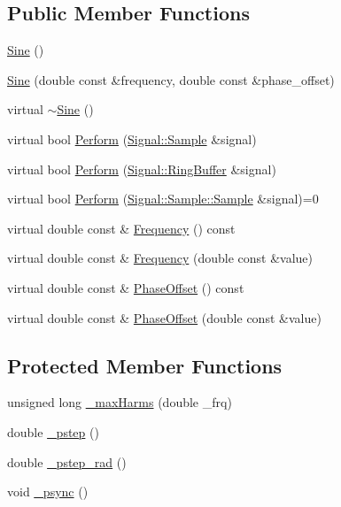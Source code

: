 \subsection*{Public Member Functions}
\begin{DoxyCompactItemize}
\item 
\hyperlink{classDSG_1_1Fourier_1_1Sine_a64fba7d61240126e79a607bf1c8cd027}{Sine} ()
\item 
\hyperlink{classDSG_1_1Fourier_1_1Sine_a620aa5683a05ac135eed9ce5ebe44c66}{Sine} (double const \&frequency, double const \&phase\-\_\-offset)
\item 
virtual \hyperlink{classDSG_1_1Fourier_1_1Sine_af7cced4930a5dbcf0e0db280b689545e}{$\sim$\-Sine} ()
\item 
virtual bool \hyperlink{classDSG_1_1Fourier_1_1Sine_add96dcfdf4b181b9eef4052d7e8e0212}{Perform} (\hyperlink{classDSG_1_1Signal_1_1Sample}{Signal\-::\-Sample} \&signal)
\item 
virtual bool \hyperlink{classDSG_1_1Fourier_1_1Sine_a58ef65b155a691dad31eefe4dd3303f1}{Perform} (\hyperlink{classDSG_1_1Signal_1_1RingBuffer}{Signal\-::\-Ring\-Buffer} \&signal)
\item 
virtual bool \hyperlink{classDSG_1_1SignalProcess_ae8a803d175eca1ec5f34a52035a082b4}{Perform} (\hyperlink{classDSG_1_1Signal_1_1Sample_a21db6fade3ee3554ed3887cb2b74daff}{Signal\-::\-Sample\-::\-Sample} \&signal)=0
\item 
virtual double const \& \hyperlink{classDSG_1_1SignalGenerator_aedac746c5a70818d120858542ecb7c45}{Frequency} () const 
\item 
virtual double const \& \hyperlink{classDSG_1_1SignalGenerator_ae3ce8d45bafabbd86a0f535b15c3cd46}{Frequency} (double const \&value)
\item 
virtual double const \& \hyperlink{classDSG_1_1SignalGenerator_a1ce521847edd0b837fd840998f906b4b}{Phase\-Offset} () const 
\item 
virtual double const \& \hyperlink{classDSG_1_1SignalGenerator_a08b71b1f30ba65e629642c570291dc0e}{Phase\-Offset} (double const \&value)
\end{DoxyCompactItemize}
\subsection*{Protected Member Functions}
\begin{DoxyCompactItemize}
\item 
unsigned long \hyperlink{classDSG_1_1Fourier_1_1FourierGenerator_a38d0cc3f7f26e89379626627c17ae33a}{\-\_\-max\-Harms} (double \-\_\-frq)
\item 
double \hyperlink{classDSG_1_1SignalGenerator_ac0d781b8673b3a283bf7c133290ede50}{\-\_\-pstep} ()
\item 
double \hyperlink{classDSG_1_1SignalGenerator_ae660eb4caa88b8d278f8d24d0908a487}{\-\_\-pstep\-\_\-rad} ()
\item 
void \hyperlink{classDSG_1_1SignalGenerator_a05baccb38d1e52860d4fcf7cb8430efc}{\-\_\-psync} ()
\end{DoxyCompactItemize}

